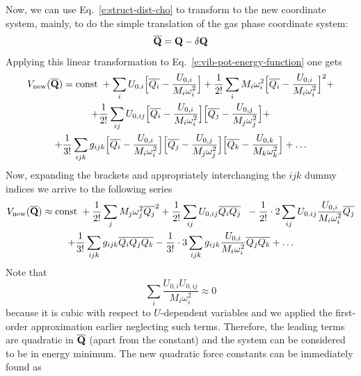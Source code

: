 \documentclass[a4paper,titlepage,twoside,fleqn,12pt]{book}
\begin{document}
\begin{refsection}
Now, we can use Eq.~\eqref{e:struct-dist-cho} to transform to the new coordinate system, mainly,
to do the simple translation of the gas phase coordinate system:
%
\begin{equation} \label{e:struct-dist-cho-transl}
\overline{\bf Q} = {\bf Q} - \delta {\bf Q}
\end{equation}
%
Applying this linear transformation to Eq.~\eqref{e:vib-pot-energy-function} one gets
%
\begin{multline}   \label{exp}
V_{\rm new}(\overline{\bf Q}) = {\rm const}\;+\sum_i U_{0,i}\Big[\overline{Q_i}-\frac{U_{0,i}}{M_i\omega_i^2}\Big]
+ \frac{1}{2!} \sum_i M_i \omega_i^2 \Big[\overline{Q_i} - \frac{U_{0,i}}{M_i\omega_i^2}\Big]^2  +  \\
+ \frac{1}{2!} \sum_{ij} U_{0,ij} \Big[\overline{Q_i} - \frac{U_{0,i}}{M_i\omega_i^2}\Big] 
\Big[\overline{Q_j} - \frac{U_{0,j}}{M_j\omega_j^2}\Big] +  \\
+ \frac{1}{3!} \sum_{ijk} g_{ijk}  
\Big[\overline{Q_i} - \frac{U_{0,i}}{M_i\omega_i^2}\Big]
\Big[\overline{Q_j} - \frac{U_{0,j}}{M_j\omega_j^2}\Big]
\Big[\overline{Q_k} - \frac{U_{0,k}}{M_k\omega_k^2}\Big]  
+ \ldots
\end{multline}
%
Now, expanding the brackets and
appropriately interchanging the $ijk$ dummy indices we arrive to the following
series
%
\begin{multline}\label{exp2}
V_{\rm new}(\overline{\bf Q}) \approx {\rm const}\; 
+ \frac{1}{2!} \sum_j M_j \omega_j^2 \overline{Q_j}^2 
+ \frac{1}{2!} \sum_{ij} U_{0,ij} \overline{Q_i} \overline{Q_j} \;\;
 - \frac{1}{2!} \cdot 2 \sum_{ij} U_{0,ij} \frac{U_{0,i}}{M_i\omega_i^2} \overline{Q_j} \\
+ \frac{1}{3!} \sum_{ijk} g_{ijk} \overline{Q_i}\overline{Q_j}\overline{Q_k}  
- \frac{1}{3!} \cdot 3\sum_{ijk} g_{ijk} \frac{U_{0,i}}{M_i\omega_i^2} \overline{Q_j}\overline{Q_k} 
+ \ldots
\end{multline}
%
Note that
%
\begin{equation}
\sum_i \frac{ U_{0,i} U_{0,ij} }{M_i\omega_i^2}  \approx 0
\end{equation}
%
because it is cubic with respect to $U$\hyp{}dependent variables and we
applied the first\hyp{}order approximation earlier neglecting such terms. 
Therefore, the leading terms are quadratic in $\overline{\bf Q}$
(apart from the constant) and the system can be considered to be in energy minimum.
The new quadratic force constants can be immediately found as
%
\begin{equation} \label{e:force-const-cho}

\end{equation}
\end{refsection}
\end{document}
